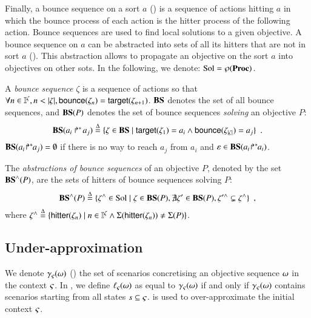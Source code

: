 Finally, a bounce sequence on a sort $a$ () is a sequence of actions hitting $a$
in which the bounce process of each action is the hitter process of the following action.
Bounce sequences are used to find local solutions to a given objective.
A bounce sequence on $a$ can be abstracted into sets of all its hitters that are not in sort $a$ ().
This abstraction allows to propagate an objective on the sort $a$ into objectives on other sots.
In the following, we denote: $\mathrm{Sol} = \wp(\mathbf{Proc})$.
\begin{definition}
\label{def:bs}
  A \emph{bounce sequence} $\zeta$ is a sequence of actions so that $\forall n \in \mathbb{I}^{\zeta}, n < |\zeta|, \mathsf{bounce}(\zeta_{n}) = \mathsf{target}(\zeta_{n+1})$.
  $\mathbf{BS}$ denotes the set of all bounce sequences, and
  $\mathbf{BS}(P)$ denotes the set of bounce sequences \emph{solving} an objective $P$:
  \[
    \mathbf{BS}(\mbox{$a_i\Rsh^*\!a_j$}) \stackrel{\Delta}= \{ \zeta \in \mathbf{BS} \mid \mathsf{target}(\zeta_1)= a_i \wedge \mathsf{bounce}(\zeta_{|\zeta|}) = a_j \} \enspace.
  \]
  $\mathbf{BS}({a_i\!\Rsh^*\!\!a_j}) = \emptyset$ if there is no way to reach $a_j$ from $a_i$ and $\varepsilon \in \mathbf{BS}({a_i\!\Rsh^*\!\!a_i})$.
\end{definition}
%
\begin{definition}[$\aBS:\Obj \rightarrow \powerset(\Sol)$]
\label{def:aBS}
  The \emph{abstractions of bounce sequences} of an objective $P$, denoted by the set $\mathbf{BS}^\wedge(P)$, are the sets of hitters of bounce sequences solving $P$:
  \[
    \mathbf{BS}^\wedge(P) \stackrel{\Delta}= \{ \zeta^\wedge \in \mathrm{Sol} \mid \zeta \in \mathbf{BS}(P), \nexists \zeta' \in \mathbf{BS}(P), \zeta'^\wedge \subsetneq \zeta^\wedge \} \enspace,
  \]
  where $\zeta^\wedge \stackrel{\Delta}= \{ \mathsf{hitter}(\zeta_n) \mid  n \in \mathbb{I}^{\zeta} \wedge \Sigma(\mathsf{hitter}(\zeta_n)) \neq \Sigma(P) \}$.
\end{definition}



\subsection{Under-approximation}

We denote $\gamma_\varsigma(\omega)$ () the set of scenarios concretising an objective sequence $\omega$ in the context $\varsigma$.
In , we define $\ell_\varsigma(\omega)$ as equal to $\gamma_\varsigma(\omega)$ if and only if $\gamma_\varsigma(\omega)$ contains scenarios starting from all states $s \subseteq \varsigma$.
 is used to over-approximate the initial context $\varsigma$.

